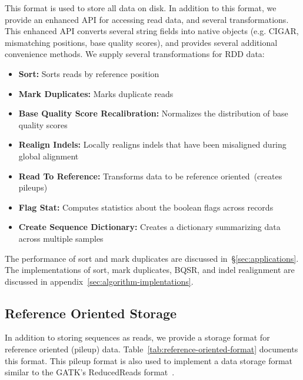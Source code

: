 \documentclass[10pt,twocolumn]{article}
\theoremstyle{plain}
\begin{document}
This format is used to store all data on disk. In addition to this format, we provide an enhanced API for accessing read
data, and several transformations. This enhanced API converts several string fields into native objects (e.g. CIGAR, mismatching
positions, base quality scores), and provides several additional convenience methods. We supply several transformations for 
RDD data:

\begin{itemize}
\item {\bf Sort:} Sorts reads by reference position
\item {\bf Mark Duplicates:} Marks duplicate reads
\item {\bf Base Quality Score Recalibration:} Normalizes the distribution of base quality scores
\item {\bf Realign Indels:} Locally realigns indels that have been misaligned during global alignment
\item {\bf Read To Reference:} Transforms data to be reference oriented~(creates pileups)
\item {\bf Flag Stat:} Computes statistics about the boolean flags across records
\item {\bf Create Sequence Dictionary:} Creates a dictionary summarizing data across multiple samples
\end{itemize}

The performance of sort and mark duplicates are discussed in~\S\ref{sec:applications}. The implementations of sort, mark duplicates,
BQSR, and indel realignment are discussed in appendix~\ref{sec:algorithm-implentations}.

\subsection{Reference Oriented Storage}
\label{sec:reference-oriented-storage}

In addition to storing sequences as reads, we provide a storage format for reference oriented (pileup) data. Table~\ref{tab:reference-oriented-format} documents this format. This pileup format is also used to implement a data storage
format similar to the GATK's ReducedReads format~\cite{depristo11}.
\end{document}
